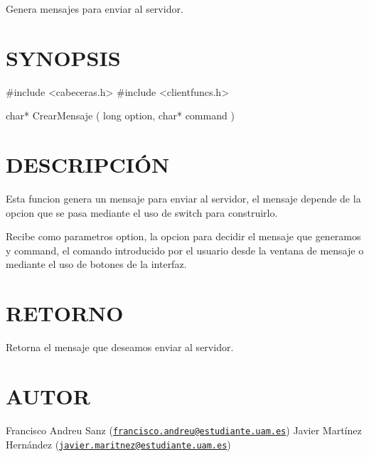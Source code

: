 Genera mensajes para enviar al servidor.\hypertarget{unknown_case_SYNOPSIS}{}\section{S\-Y\-N\-O\-P\-S\-I\-S}\label{unknown_case_SYNOPSIS}
\begin{DoxyVerb} #include  <cabeceras.h>
   #include  <clientfuncs.h>

 char* CrearMensaje ( long option, char*  command  )
\end{DoxyVerb}
\hypertarget{unknown_case_descripcion}{}\section{D\-E\-S\-C\-R\-I\-P\-C\-IÓ\-N}\label{unknown_case_descripcion}
Esta funcion genera un mensaje para enviar al servidor, el mensaje depende de la opcion que se pasa mediante el uso de switch para construirlo.

Recibe como parametros option, la opcion para decidir el mensaje que generamos y command, el comando introducido por el usuario desde la ventana de mensaje o mediante el uso de botones de la interfaz.\hypertarget{unknown_case_retorno}{}\section{R\-E\-T\-O\-R\-N\-O}\label{unknown_case_retorno}
Retorna el mensaje que deseamos enviar al servidor.\hypertarget{unknown_case_authors}{}\section{A\-U\-T\-O\-R}\label{unknown_case_authors}
Francisco Andreu Sanz (\href{mailto:francisco.andreu@estudiante.uam.es}{\tt francisco.\-andreu@estudiante.\-uam.\-es}) Javier Martínez Hernández (\href{mailto:javier.maritnez@estudiante.uam.es}{\tt javier.\-maritnez@estudiante.\-uam.\-es}) 

 